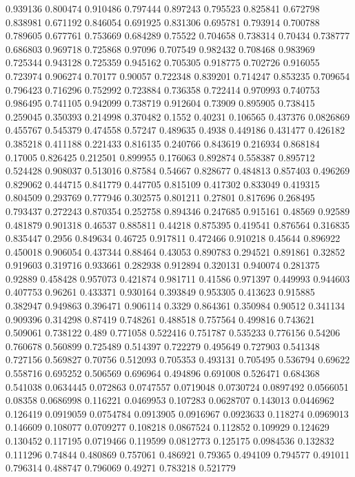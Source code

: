 0.939136 0.800474
0.910486 0.797444
0.897243 0.795523
0.825841 0.672798
0.838981 0.671192
0.846054 0.691925
0.831306 0.695781
0.793914 0.700788
0.789605 0.677761
0.753669 0.684289
0.75522 0.704658
0.738314 0.70434
0.738777 0.686803
0.969718 0.725868
0.97096 0.707549
0.982432 0.708468
0.983969 0.725344
0.943128 0.725359
0.945162 0.705305
0.918775 0.702726
0.916055 0.723974
0.906274 0.70177
0.90057 0.722348
0.839201 0.714247
0.853235 0.709654
0.796423 0.716296
0.752992 0.723884
0.736358 0.722414
0.970993 0.740753
0.986495 0.741105
0.942099 0.738719
0.912604 0.73909
0.895905 0.738415
0.259045 0.350393
0.214998 0.370482
0.1552 0.40231
0.106565 0.437376
0.0826869 0.455767
0.545379 0.474558
0.57247 0.489635
0.4938 0.449186
0.431477 0.426182
0.385218 0.411188
0.221433 0.816135
0.240766 0.843619
0.216934 0.868184
0.17005 0.826425
0.212501 0.899955
0.176063 0.892874
0.558387 0.895712
0.524428 0.908037
0.513016 0.87584
0.54667 0.828677
0.484813 0.857403
0.496269 0.829062
0.444715 0.841779
0.447705 0.815109
0.417302 0.833049
0.419315 0.804509
0.293769 0.777946
0.302575 0.801211
0.27801 0.817696
0.268495 0.793437
0.272243 0.870354
0.252758 0.894346
0.247685 0.915161
0.48569 0.92589
0.481879 0.901318
0.46537 0.885811
0.44218 0.875395
0.419541 0.876564
0.316835 0.835447
0.2956 0.849634
0.46725 0.917811
0.472466 0.910218
0.45644 0.896922
0.450018 0.906054
0.437344 0.88464
0.43053 0.890783
0.294521 0.891861
0.32852 0.919603
0.319716 0.933661
0.282938 0.912894
0.320131 0.940074
0.281375 0.92889
0.458428 0.957073
0.421874 0.981711
0.41586 0.971397
0.449993 0.944603
0.407753 0.96261
0.433371 0.930164
0.393849 0.953305
0.413623 0.915885
0.382947 0.949863
0.396471 0.906114
0.3329 0.864361
0.350984 0.90512
0.341134 0.909396
0.314298 0.87419
0.748261 0.488518
0.757564 0.499816
0.743621 0.509061
0.738122 0.489
0.771058 0.522416
0.751787 0.535233
0.776156 0.54206
0.760678 0.560899
0.725489 0.514397
0.722279 0.495649
0.727903 0.541348
0.727156 0.569827
0.70756 0.512093
0.705353 0.493131
0.705495 0.536794
0.69622 0.558716
0.695252 0.506569
0.696964 0.494896
0.691008 0.526471
0.684368 0.541038
0.0634445 0.072863
0.0747557 0.0719048
0.0730724 0.0897492
0.0566051 0.08358
0.0686998 0.116221
0.0469953 0.107283
0.0628707 0.143013
0.0446962 0.126419
0.0919059 0.0754784
0.0913905 0.0916967
0.0923633 0.118274
0.0969013 0.146609
0.108077 0.0709277
0.108218 0.0867524
0.112852 0.109929
0.124629 0.130452
0.117195 0.0719466
0.119599 0.0812773
0.125175 0.0984536
0.132832 0.111296
0.74844 0.480869
0.757061 0.486921
0.79365 0.494109
0.794577 0.491011
0.796314 0.488747
0.796069 0.49271
0.783218 0.521779
